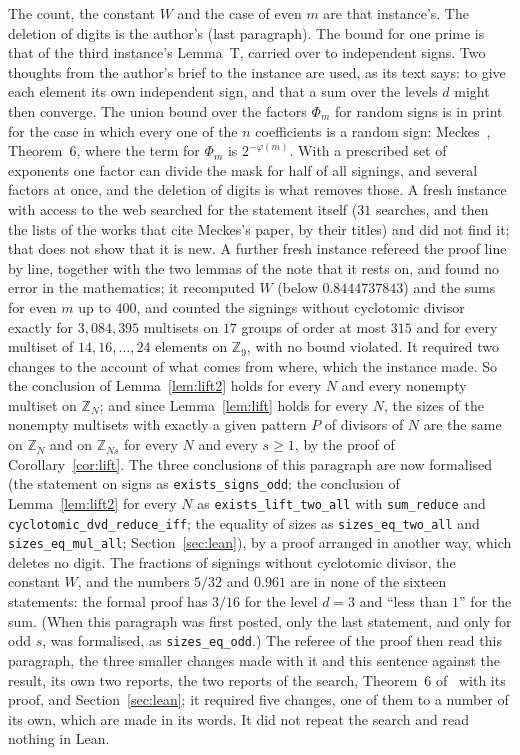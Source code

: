 \documentclass[11pt,a4paper]{amsart}
\theoremstyle{definition}
\theoremstyle{remark}
\newcommand{\Z}{\mathbb{Z}}
\newcommand{\lean}[1]{\texttt{#1}}
\begin{document}
The count, the constant $W$ and the case of even $m$ are that instance's. The deletion of digits is the author's (last
paragraph). The bound for one prime is that of the third instance's Lemma~T, carried over to independent signs. Two
thoughts from the author's brief to the instance are used, as its text says: to give each element its own independent
sign, and that a sum over the levels $d$ might then converge. The union bound over the factors $\Phi_m$ for random signs
is in print for the case in which every one of the $n$ coefficients is a random sign: Meckes~\cite{Meckes},
Theorem~6, where the term for $\Phi_m$ is $2^{-\varphi(m)}$. With a prescribed set of exponents one factor can divide
the mask for half of all signings, and several factors at once, and the deletion of digits is what removes those. A
fresh instance with access to the web searched for the statement itself ($31$ searches, and then the lists of the works that cite
Meckes's paper, by their titles) and did not find it; that does not show that it is new. A further fresh instance refereed the proof
line by line, together with the two lemmas of the note that it rests on, and found no error in the mathematics; it
recomputed $W$ (below $0.8444737843$) and the sums for even $m$ up to $400$, and counted the signings without
cyclotomic divisor exactly for $3{,}084{,}395$ multisets on $17$ groups of order at most $315$ and for every multiset
of $14,16,\dots,24$ elements on $\Z_9$, with no bound violated. It required two changes to the account of what comes from
where, which the instance made. So the conclusion of Lemma~\ref{lem:lift2} holds for every $N$ and every nonempty
multiset on $\Z_N$; and since Lemma~\ref{lem:lift} holds for every $N$, the sizes of the nonempty multisets with
exactly a given pattern $P$ of divisors of $N$ are the same on $\Z_N$ and on $\Z_{Ns}$ for every $N$ and every
$s\ge1$, by the proof of Corollary~\ref{cor:lift}. The three conclusions of this paragraph are now formalised (the statement on signs as
\lean{exists\_signs\_odd}; the conclusion of Lemma~\ref{lem:lift2} for every $N$ as \lean{exists\_lift\_two\_all} with
\lean{sum\_reduce} and \lean{cyclotomic\_dvd\_reduce\_iff}; the equality of sizes as \lean{sizes\_eq\_two\_all} and
\lean{sizes\_eq\_mul\_all}; Section~\ref{sec:lean}), by a proof arranged in another way, which deletes no digit. The
fractions of signings without cyclotomic divisor, the constant $W$, and the numbers $5/32$ and $0.961$ are in none of
the sixteen statements: the formal proof has $3/16$ for the level
$d=3$ and ``less than $1$'' for the sum. (When this paragraph was first posted, only the last statement, and only for
odd $s$, was formalised, as \lean{sizes\_eq\_odd}.) The referee of the proof then read this paragraph, the three smaller changes made with it and this sentence against the result, its own two reports, the two reports of the search, Theorem~6 of~\cite{Meckes} with its proof, and Section~\ref{sec:lean}; it required five changes, one of them to a number of its own, which are made in its words. It did not repeat the search and read nothing in Lean.
\end{document}
